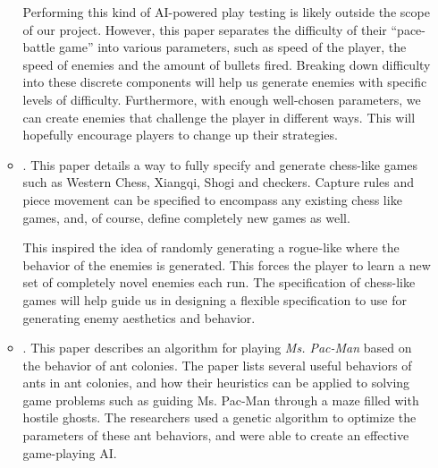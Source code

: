 \documentclass[a4paper, 10pt, american]{article}
\begin{document}
\begin{itemize}
\begin{itemize}
				Performing this kind of AI-powered play testing is likely
				outside the scope of our project. However, this paper separates
				the difficulty of their ``pace-battle game'' into various
				parameters, such as speed of the player, the speed of enemies
				and the amount of bullets fired. Breaking down difficulty into
				these discrete components will help us generate enemies with
				specific levels of difficulty. Furthermore, with enough
				well-chosen parameters, we can create enemies that challenge the
				player in different ways. This will hopefully encourage players
				to change up their strategies.

			\item \cite{pell1992}. This paper details a way to fully specify and
				generate chess-like games such as Western Chess, Xiangqi, Shogi
				and checkers. Capture rules and piece movement can be specified
				to encompass any existing chess like games, and, of course,
				define completely new games as well.

				This inspired the idea of randomly generating a rogue-like where
				the behavior of the enemies is generated. This forces the player
				to learn a new set of completely novel enemies each run. The
				specification of chess-like games will help guide us in
				designing a flexible specification to use for generating enemy
				aesthetics and behavior.

			\item \cite{emilio2010}. This paper describes an algorithm for
				playing \textit{Ms. Pac-Man} based on the behavior of ant
				colonies. The paper lists several useful behaviors of ants in
				ant colonies, and how their heuristics can be applied to solving
				game problems such as guiding Ms. Pac-Man through a maze filled
				with hostile ghosts. The researchers used a genetic algorithm to
				optimize the parameters of these ant behaviors, and were able to
				create an effective game-playing AI.


\end{itemize}
\end{itemize}
\end{document}
